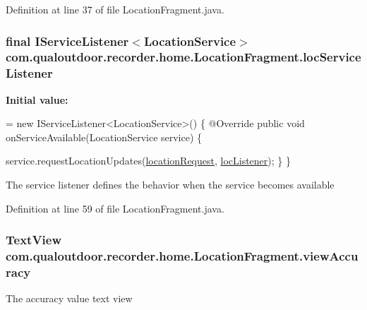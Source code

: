 Definition at line 37 of file Location\-Fragment.\-java.

\hypertarget{classcom_1_1qualoutdoor_1_1recorder_1_1home_1_1LocationFragment_aaf47723fb7dbea8b4b853226414751f9}{
\subsubsection[{loc\-Service\-Listener}]{\setlength{\rightskip}{0pt plus 5cm}final I\-Service\-Listener$<${\bf Location\-Service}$>$ com.\-qualoutdoor.\-recorder.\-home.\-Location\-Fragment.\-loc\-Service\-Listener\hspace{0.3cm}{\ttfamily [private]}}}\label{classcom_1_1qualoutdoor_1_1recorder_1_1home_1_1LocationFragment_aaf47723fb7dbea8b4b853226414751f9}
{\bfseries Initial value\-:}
\begin{DoxyCode}
= \textcolor{keyword}{new} IServiceListener<LocationService>() \{
        @Override
        \textcolor{keyword}{public} \textcolor{keywordtype}{void} onServiceAvailable(LocationService service) \{
            
            service.requestLocationUpdates(\hyperlink{classcom_1_1qualoutdoor_1_1recorder_1_1home_1_1LocationFragment_af5fb1c9b499a730dbc82633e3ca9938f}{locationRequest}, 
      \hyperlink{classcom_1_1qualoutdoor_1_1recorder_1_1home_1_1LocationFragment_ab494bebfd465bfe1c6e816dd84e7c1b9}{locListener});
        \}
    \}
\end{DoxyCode}
The service listener defines the behavior when the service becomes available 

Definition at line 59 of file Location\-Fragment.\-java.

\hypertarget{classcom_1_1qualoutdoor_1_1recorder_1_1home_1_1LocationFragment_a004a780fe8b36290a3dd0b4d0b0139d5}{
\subsubsection[{view\-Accuracy}]{\setlength{\rightskip}{0pt plus 5cm}Text\-View com.\-qualoutdoor.\-recorder.\-home.\-Location\-Fragment.\-view\-Accuracy\hspace{0.3cm}{\ttfamily [private]}}}\label{classcom_1_1qualoutdoor_1_1recorder_1_1home_1_1LocationFragment_a004a780fe8b36290a3dd0b4d0b0139d5}
The accuracy value text view 

